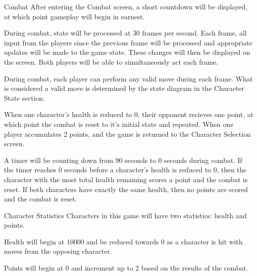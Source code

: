 \documentclass[12pt]{report}
\begin{document}
\begin{section}{Combat}
After entering the Combat screen, a short countdown will be displayed, at which
point gameplay will begin in earnest.

During combat, state will be processed at 30 frames per second. Each frame, all
input from the players since the previous frame will be processed and
appropriate updates will be made to the game state. These changes will then be
displayed on the screen. Both players will be able to simultaneously act each
frame.

During combat, each player can perform any valid move during each frame. What
is considered a valid move is determined by the state diagram in the Character
State section.

When one character's health is reduced to 0, their opponent recieves one point,
at which point the combat is reset to it's initial state and repeated. When
one player accumulates 2 points, and the game is returned to the Character
Selection screen.

A timer will be counting down from 90 seconds to 0 seconds during combat. If the
timer reaches 0 seconds before a character's health is reduced to 0, then the
character with the most total health remaining scores a point and the combat is
reset. If both characters have exactly the same health, then no points are
scored and the combat is reset.
\end{section}

\begin{section}{Character Statistics}
Characters in this game will have two statistics: health and points.

Health will begin at 10000 and be reduced towards 0 as a character is hit with
moves from the opposing character.

Points will begin at 0 and increment up to 2 based on the results of the combat.
\end{section}
\end{document}
